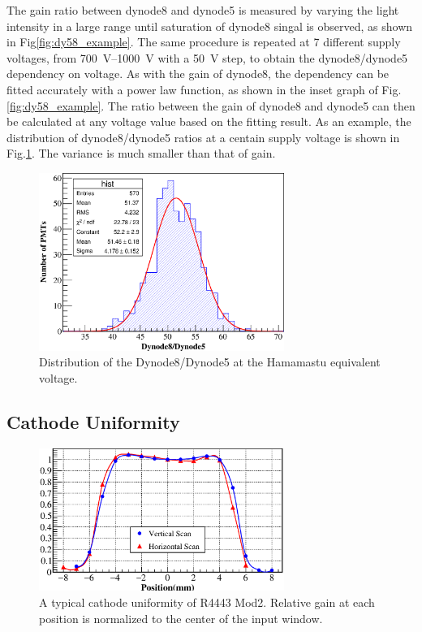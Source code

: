 \documentclass[5p, times]{elsarticle}
\begin{document}
The gain ratio between dynode8 and dynode5 is measured by varying the light intensity in a large range until saturation of dynode8 singal is observed, as shown in Fig\ref{fig:dy58_example}.
The same procedure is repeated at 7 different supply voltages, from \SIrange{700}{1000}{\volt} with a \SI{50}{\volt} step, to obtain the dynode8/dynode5 dependency on voltage.
As with the gain of dynode8, the dependency can be fitted accurately with a power law function, as shown in the inset graph of Fig.\ref{fig:dy58_example}.
The ratio between the gain of dynode8 and dynode5 can then be calculated at any voltage value based on the fitting result.
As an example, the distribution of dynode8/dynode5 ratios at a centain supply voltage is shown in Fig.\ref{fig:dy58_dist}.
The variance is much smaller than that of gain.

\begin{figure}
 \centering
 \includegraphics[width=80mm]{dy58_dist}
\caption{Distribution of the Dynode8/Dynode5 at the Hamamastu equivalent voltage.}
\label{fig:dy58_dist}
\end{figure} 

\subsection{Cathode Uniformity}
\label{sec:psd_cathodescan}

\begin{figure}
 \centering
 \includegraphics[width=80mm]{cathode_uniformity}
\caption{A typical cathode uniformity of R4443 Mod2.
Relative gain at each position is normalized to the center of the input window.}
\label{fig:cathode_uniformity}
\end{figure} 
\end{document}
